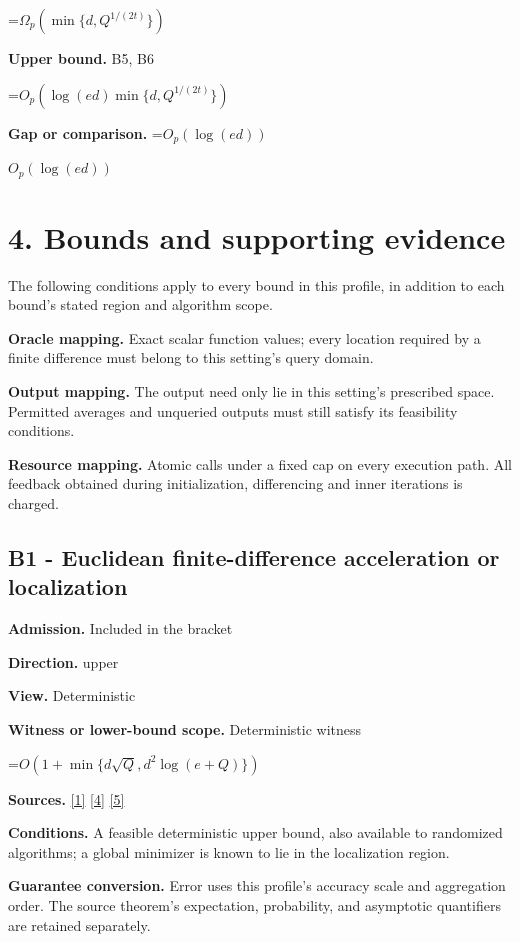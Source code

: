 \documentclass[10pt,a4paper]{article}
\newcommand{\AtlasMath}[1]{\par\begingroup\centering\setbox0=\hbox{$\displaystyle #1$}\ifdim\wd0>1.4\linewidth\typeout{ATLAS WIDE FORMULA: \the\wd0}\fi\ifdim\wd0>\linewidth\resizebox{\linewidth}{!}{\box0}\else\box0\fi\par\endgroup}
\newcommand{\AtlasInlineMath}[1]{\begingroup\setbox0=\hbox{$#1$}\ifdim\wd0>.4\linewidth\endgroup\AtlasMath{#1}\else\endgroup$#1$\fi}
\begin{document}
\AtlasMath{\Omega_p(\min\{d,Q^{1/(2t)}\})}
\textbf{Upper bound.} B5, B6

\AtlasMath{O_p(\log(ed)\min\{d,Q^{1/(2t)}\})}
\textbf{Gap or comparison.} \AtlasInlineMath{O_p(\log(ed))}

\section{4. Bounds and supporting evidence}
The following conditions apply to every bound in this profile, in addition to each bound's stated region and algorithm scope.

\textbf{Oracle mapping.} Exact scalar function values; every location required by a finite difference must belong to this setting's query domain.

\textbf{Output mapping.} The output need only lie in this setting's prescribed space. Permitted averages and unqueried outputs must still satisfy its feasibility conditions.

\textbf{Resource mapping.} Atomic calls under a fixed cap on every execution path. All feedback obtained during initialization, differencing and inner iterations is charged.

\subsection{B1 - Euclidean finite-difference acceleration or localization}
\textbf{Admission.} Included in the bracket

\textbf{Direction.} upper

\textbf{View.} Deterministic

\textbf{Witness or lower-bound scope.} Deterministic witness

\AtlasMath{O(1+\min\{d\sqrt Q,d^2\log(e+Q)\})}
\textbf{Sources.} \href{https://arxiv.org/html/2610.00345v1}{[1]} \href{https://arxiv.org/html/2607.16558v2}{[4]} \href{https://www.mathnet.ru/php/archive.phtml?jrnid=mzm&option_lang=eng&paperid=1697&wshow=paper}{[5]}

\textbf{Conditions.} A feasible deterministic upper bound, also available to randomized algorithms; a global minimizer is known to lie in the localization region.

\textbf{Guarantee conversion.} Error uses this profile's accuracy scale and aggregation order. The source theorem's expectation, probability, and asymptotic quantifiers are retained separately.
\end{document}
